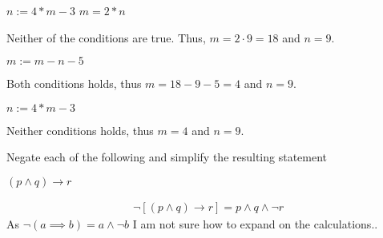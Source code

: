 \documentclass[a4paper, english, 12pt]{article} %
\begin{document}
\begin{subproblem}
  \begin{algorithmic}
    \STATE {}
    \STATE $n := 4 * m - 3$
    \ELSE
    \STATE $m = 2*n$
    \ENDIF
  \end{algorithmic}
\end{subproblem}

\begin{answer}
  Neither of the conditions are true. Thus,  $m = 2\cdot 9 = 18$ and $n=9$.
\end{answer}
  
\begin{subproblem}
  \begin{algorithmic}
    \STATE
    \STATE $m := m - n - 5$
    \ENDIF
  \end{algorithmic}
\end{subproblem}

\begin{answer}
  Both conditions holds, thus $m = 18 - 9 - 5 = 4$ and $n = 9$.
\end{answer}

\begin{subproblem}
  \begin{algorithmic}
    \STATE {}
    \STATE $n := 4 * m - 3$ \ENDIF
  \end{algorithmic}
\end{subproblem}

\begin{answer}
  Neither conditions holds, thus $m = 4$ and $n = 9$.
\end{answer}

  
\begin{problem}[6]
  Negate each of the following and simplify the resulting statement
\end{problem}

\begin{subproblem}[2]
  $(p \wedge q) \to r$
\end{subproblem}

\begin{answer}
\begin{align*}
  \neg [(p \wedge q) \to r]
  = p \wedge q \wedge \neg r 
\end{align*}
  As $\neg(a \implies b) = a \wedge \neg b$ I am not sure how to expand on the calculations..
\end{answer}
\end{document}
